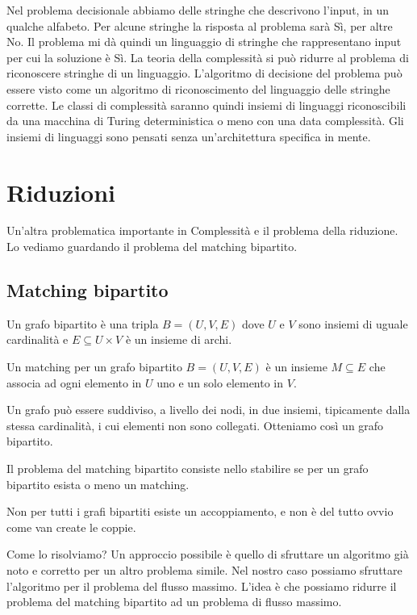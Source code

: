 Nel problema decisionale abbiamo delle stringhe che descrivono l'input, in un qualche alfabeto.  Per
alcune stringhe la risposta al problema sarà Sì, per altre No. Il problema mi dà quindi un
linguaggio di stringhe che rappresentano input per cui la soluzione è Sì. La teoria della
complessità si può ridurre al problema di riconoscere stringhe di un linguaggio. L'algoritmo di
decisione del problema può essere visto come un algoritmo di riconoscimento del linguaggio delle
stringhe corrette. Le classi di complessità saranno quindi insiemi di linguaggi riconoscibili da
una macchina di Turing deterministica o meno con una data complessità.  Gli insiemi di linguaggi
sono pensati senza un'architettura specifica in mente.

\section{Riduzioni}

Un'altra problematica importante in Complessità e il problema della riduzione. Lo vediamo guardando
il problema del matching bipartito.

\subsection{Matching bipartito}

\begin{defn}
    Un grafo bipartito è una tripla $B = (U,V,E)$ dove $U$ e $V$ sono insiemi di uguale
    cardinalità e $E \subseteq U \times V$ è un insieme di archi.
\end{defn}

\begin{defn}
    Un matching per un grafo bipartito $B = (U,V,E)$ è un insieme $M \subseteq E$ che associa ad
    ogni elemento in $U$ uno e un solo elemento in $V$.
\end{defn}

Un grafo può essere suddiviso, a livello dei nodi, in due insiemi, tipicamente dalla stessa
cardinalità, i cui elementi non sono collegati. Otteniamo così un grafo bipartito.

Il problema del matching bipartito consiste nello stabilire se per un grafo bipartito esista o meno
un matching.

Non per tutti i grafi bipartiti esiste un accoppiamento, e non è del tutto ovvio come van create le
coppie.

Come lo risolviamo? Un approccio possibile è quello di sfruttare un algoritmo già noto e corretto
per un altro problema simile. Nel nostro caso possiamo sfruttare l'algoritmo per il problema del
flusso massimo. L'idea è che possiamo ridurre il problema del matching bipartito ad un problema di
flusso massimo.

